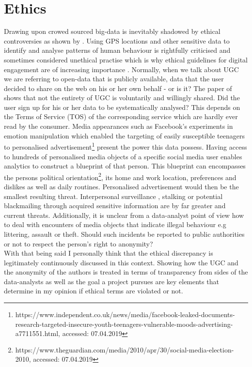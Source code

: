 \section{Ethics}
Drawing upon crowed sourced big-data is inevitably shadowed by ethical controversies as shown by \textcite{Taylor2018}. Using GPS locations and other sensitive data to identify and analyse patterns of human behaviour is rightfully criticised and sometimes considered unethical practise \parencite{Taylor2018} which is why ethical guidelines for digital engagement are of increasing importance \parencite{Bowen2013}. Normally, when we talk about UGC we are referring to open-data that is publicly available, data that the user decided to share on the web on his or her own behalf - or is it? The paper of \textcite{Estima2016} shows that not the entirety of UGC is voluntarily and willingly shared. Did the user sign up for his or her data to be systematically analysed? This depends on the Terms of Service (TOS) of the corresponding service which are hardly ever read by the consumer. Media appearances such as Facebook's experiments in emotion manipulation \parencite{Jouhki2016} which enabled the targeting of easily susceptible teenagers to personalised advertisement\footnote{https://www.independent.co.uk/news/media/facebook-leaked-documents-research-targeted-insecure-youth-teenagers-vulnerable-moods-advertising-a7711551.html, accessed: 07.04.2019} present the power this data possess. Having access to hundreds of personalised media objects of a specific social media user enables analytics to construct a blueprint of that person. This blueprint can encompasses the persons political orientation\footnote{https://www.theguardian.com/media/2010/apr/30/social-media-election-2010, accessed: 07.04.2019}, its home and work location, preferences and dislikes as well as daily routines. Personalised advertisement would then be the smallest resulting threat. Interpersonal surveillance \parencite{Trottier2017}, stalking \parencite{Lyndon2011} or potential blackmailing through acquired sensitive information are by far greater and current threats. Additionally, it is unclear from a data-analyst point of view how to deal with encounters of media objects that indicate illegal behaviour e.g littering, assault or theft. Should such incidents be reported to public authorities or not to respect the person's right to anonymity?\\

With that being said I personally think that the ethical discrepancy is legitimately continuously discussed in this context. Showing how the UGC and the anonymity of the authors is treated in terms of transparency from sides of the data-analysts as well as the goal a project pursues are key elements that determine in my opinion if ethical terms are violated or not. \\

